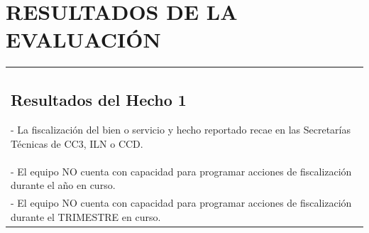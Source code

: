 \documentclass[
  11pt,
  a4paper,
  oneside]{article}
\begin{document}
\section{RESULTADOS DE LA
EVALUACIÓN}\label{resultados-de-la-evaluaciuxf3n}

\setlength{\arrayrulewidth}{0.35mm}
\setlength\extrarowheight{5pt}
\begin{longtable}{| p{14.5cm} |}
\hline
\endhead
\subsection{Resultados del Hecho  1 }- La fiscalización del bien o servicio y hecho reportado recae en las Secretarías Técnicas de CC3, ILN o CCD.\\ [10pt]
- El equipo NO cuenta con capacidad para programar acciones de fiscalización durante el año en curso.\\ [10pt]
- El equipo NO cuenta con capacidad para programar acciones de fiscalización durante el TRIMESTRE en curso.\\ [10pt]
\hline
\end{longtable}
\end{document}
